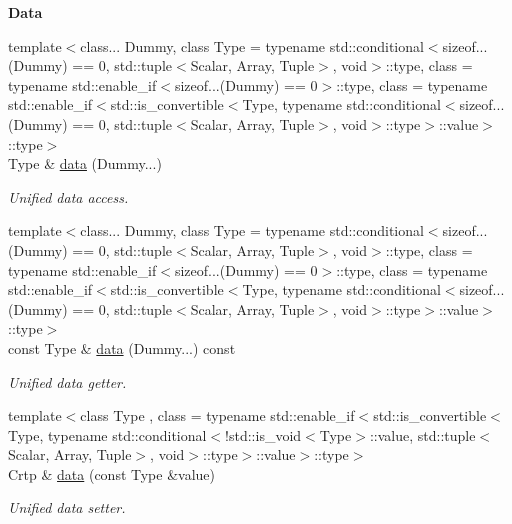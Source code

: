 \begin{Indent}{\bf Data}\par
\begin{DoxyCompactItemize}
\item 
{\footnotesize template$<$class... Dummy, class Type  = typename std\-::conditional$<$sizeof...(\-Dummy) == 0, std\-::tuple$<$\-Scalar, Array, Tuple$>$, void$>$\-::type, class  = typename std\-::enable\-\_\-if$<$sizeof...(\-Dummy) == 0$>$\-::type, class  = typename std\-::enable\-\_\-if$<$std\-::is\-\_\-convertible$<$\-Type, typename std\-::conditional$<$sizeof...(\-Dummy) == 0, std\-::tuple$<$\-Scalar, Array, Tuple$>$, void$>$\-::type$>$\-::value$>$\-::type$>$ }\\Type \& \hyperlink{classmagrathea_1_1AbstractStep_ab0f83b996e111c4519ad21bfc8ac6f7d}{data} (Dummy...)
\begin{DoxyCompactList}\small\item\em Unified data access. \end{DoxyCompactList}\item 
{\footnotesize template$<$class... Dummy, class Type  = typename std\-::conditional$<$sizeof...(\-Dummy) == 0, std\-::tuple$<$\-Scalar, Array, Tuple$>$, void$>$\-::type, class  = typename std\-::enable\-\_\-if$<$sizeof...(\-Dummy) == 0$>$\-::type, class  = typename std\-::enable\-\_\-if$<$std\-::is\-\_\-convertible$<$\-Type, typename std\-::conditional$<$sizeof...(\-Dummy) == 0, std\-::tuple$<$\-Scalar, Array, Tuple$>$, void$>$\-::type$>$\-::value$>$\-::type$>$ }\\const Type \& \hyperlink{classmagrathea_1_1AbstractStep_a46b053791efe59ce0ac59dc6b099d817}{data} (Dummy...) const 
\begin{DoxyCompactList}\small\item\em Unified data getter. \end{DoxyCompactList}\item 
{\footnotesize template$<$class Type , class  = typename std\-::enable\-\_\-if$<$std\-::is\-\_\-convertible$<$\-Type, typename std\-::conditional$<$!std\-::is\-\_\-void$<$\-Type$>$\-::value, std\-::tuple$<$\-Scalar, Array, Tuple$>$, void$>$\-::type$>$\-::value$>$\-::type$>$ }\\Crtp \& \hyperlink{classmagrathea_1_1AbstractStep_a561bb9eac2a69c087f21a8ef470e57d5}{data} (const Type \&value)
\begin{DoxyCompactList}\small\item\em Unified data setter. \end{DoxyCompactList}\end{DoxyCompactItemize}
\end{Indent}
